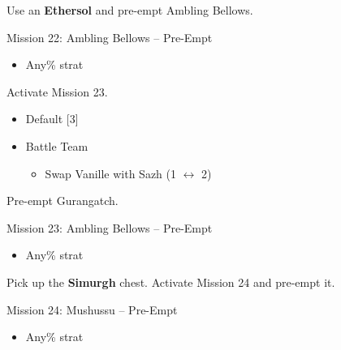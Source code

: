 Use an \textbf{Ethersol} and pre-empt Ambling Bellows.

\begin{battle}{Mission 22: Ambling Bellows -- Pre-Empt}
	\begin{itemize}
		\item Any\% strat
	\end{itemize}
\end{battle}

Activate Mission 23.

\begin{menu}
	\begin{itemize}
		\paradigm
		\begin{itemize}
			\item Default [3]
			\item Battle Team
				\begin{itemize}
					\item Swap Vanille with Sazh (1 $\leftrightarrow$ 2)
				\end{itemize}						      			      	
		\end{itemize}
	\end{itemize}
\end{menu}

Pre-empt Gurangatch.

\begin{battle}{Mission 23: Ambling Bellows -- Pre-Empt}
	\begin{itemize}
		\item Any\% strat
	\end{itemize}
\end{battle}

Pick up the \textbf{Simurgh} chest.
Activate Mission 24 and pre-empt it.

\begin{battle}{Mission 24: Mushussu -- Pre-Empt}
	\begin{itemize}
		\item Any\% strat
	\end{itemize}
\end{battle}
\vfill


